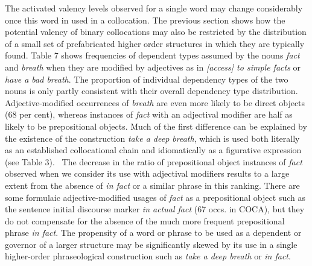 \documentclass[12pt]{article}
\newenvironment{styleStandard}{\setlength\leftskip{0cm}\setlength\rightskip{0cm plus 1fil}\setlength\parindent{0cm}\setlength\parfillskip{0pt plus 1fil}\setlength\parskip{0in plus 1pt}\writerlistparindent\writerlistleftskip\leavevmode\normalfont\normalsize\writerlistlabel\ignorespaces}{\unskip\vspace{0.111in plus 0.0111in}\par}
\newcommand\writerlistleftskip{}
\newcommand\writerlistparindent{}
\newcommand\writerlistlabel{}
\begin{document}
\begin{styleStandard}
The activated valency levels observed for a single word may change considerably once this word in used in a collocation. The previous section shows how the potential valency of binary collocations may also be restricted by the distribution of a small set of prefabricated higher order structures in which they are typically found. Table 7 shows frequencies of dependent types assumed by the nouns \textit{fact} and \textit{breath} when they are modified by adjectives as in \textit{[access] to simple facts} or \textit{have a bad breath}. The proportion of individual dependency types of the two nouns is only partly consistent with their overall dependency type distribution. Adjective-modified occurrences of \textit{breath} are even more likely to be direct objects (68 per cent), whereas instances of \textit{fact} with an adjectival modifier are half as likely to be prepositional objects. Much of the first difference can be explained by the existence of the construction \textit{take a deep breath}, which is used both literally as an established collocational chain and idiomatically as a figurative expression (see Table 3). \ The decrease in the ratio of prepositional object instances of \textit{fact} observed when we consider its use with adjectival modifiers results to a large extent from the absence of \textit{in fact} or a similar phrase in this ranking. There are some formulaic adjective-modified usages of \textit{fact} as a prepositional object such as the sentence initial discourse marker \textit{in actual fact }(67 occs. in COCA), but they do not compensate for the absence of the much more frequent prepositional phrase \textit{in fact}. The propensity of a word or phrase to be used as a dependent or governor of a larger structure may be significantly skewed by its use in a single higher-order phraseological construction such as \textit{take a deep breath} or \textit{in fact}. 
\end{styleStandard}
\end{document}
